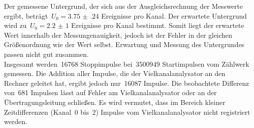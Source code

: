 Der gemessene Untergrund, der sich aus der Ausgleichsrechnung der Messwerte
ergibt, beträgt~$U_0=\num{3.75(24)}$ Ereignisse pro Kanal. Der erwartete
Untergrund wird zu~$U_0=\num{2.2(10)}$ Ereignisse pro Kanal bestimmt.
Somit liegt der erwartete Wert innerhalb der Messungenauigkeit, jedoch ist der
Fehler in der gleichen Größenordnung wie der Wert selbst. Erwartung und Messung
des Untergrundes passen nicht gut zusammen.\\
Insgesamt werden~\num{16768} Stoppimpulse bei~\num{3500949} Startimpulsen
vom Zählwerk gemessen. Die Addition aller Impulse, die der Vielkanalanalysator
an den Rechner geleitet hat, ergibt jedoch nur~\num{16087} Impulse. Die
beobachtete Differenz von~\num{681} Impulsen lässt auf Fehler am
Vielkanalanalysator oder an der Übertragungsleitung schließen. Es wird vermutet,
dass im Bereich kleiner Zeitdifferenzen (Kanal~\num{0} bis~\num{2})
Impulse vom Vielkanalanalysator nicht registriert werden.

